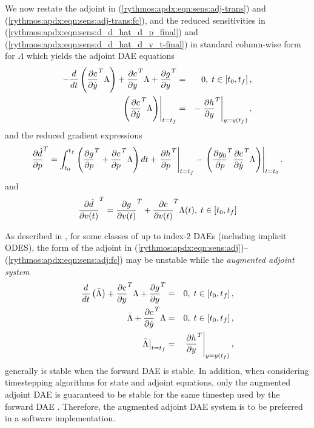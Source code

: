\documentclass[pdf,ps2pdf,11pt]{SANDreport}
\begin{document}
We now restate the adjoint in (\ref{rythmos:apdx:eqn:sens:adj-trans}) and
(\ref{rythmos:apdx:eqn:sens:adj-trans:fc}), and the reduced sensitivities in
(\ref{rythmos:apdx:eqn:sens:d_d_hat_d_p_final}) and
(\ref{rythmos:apdx:eqn:sens:d_d_hat_d_v_t-final}) in standard column-wise form
for $\Lambda$ which yields the adjoint DAE equations
%
\begin{eqnarray}
- \frac{d}{dt}\left( \displaystyle{\frac{\partial c}{\partial \dot{y}}}^T \Lambda \right)
+  \displaystyle{\frac{\partial c}{\partial y}}^T \Lambda + \displaystyle{\frac{\partial g}{\partial y}}^T
& = & 0, \; t \in \left[ t_0, t_f \right],
\label{rythmos:apdx:eqn:sens:adj} \\
\left.\left( \displaystyle{\frac{\partial c}{\partial \dot{y}}}^T \Lambda \right)\right|_{t=t_f}
& = & - \left. \displaystyle{\frac{\partial h}{\partial y}}^T \right|_{y=y(t_f)},
\label{rythmos:apdx:eqn:sens:adj:fc}
\end{eqnarray}
%
and the reduced gradient expressions
%
\begin{equation}
\displaystyle{\frac{\partial \hat{d}}{\partial p}}^T =
\int_{t_0}^{t_f} \left(
    \displaystyle{\frac{\partial g}{\partial p}}^T
    + \displaystyle{\frac{\partial c}{\partial p}}^T \Lambda
  \right) dt
  + \left. \displaystyle{\frac{\partial h}{\partial p}}^T \right|_{t=t_f}
  - \left. \left( \displaystyle{\frac{\partial y_0}{\partial p}}^T \displaystyle{\frac{\partial c}{\partial \dot{y}}}^T \Lambda \right) \right|_{t=t_0}.
\label{rythmos:apdx:eqn:sens:d_d_hat_d_p_final-2}
\end{equation}
%
and
%
\begin{equation}
\displaystyle{\frac{\partial \hat{d}}{\partial v(t)}}^T =  \displaystyle{\frac{\partial g}{\partial v(t)}}^T + \displaystyle{\frac{\partial c}{\partial v(t)}}^T \Lambda(t), \; t\in[t_0,t_f]
\label{rythmos:apdx:eqn:sens:d_d_hat_d_v_t-final-2}
\end{equation}
%

As described in {}\cite{adjoint-sens-2003}, for some classes of up to index-2
DAEs (including implicit ODES), the form of the adjoint in
(\ref{rythmos:apdx:eqn:sens:adj})--(\ref{rythmos:apdx:eqn:sens:adj:fc}) may be
unstable while the {}\textit{augmented adjoint system}
%
\begin{eqnarray}
\frac{d}{dt}\left( \bar{\Lambda} \right)
+  \displaystyle{\frac{\partial c}{\partial y}}^T \Lambda + \displaystyle{\frac{\partial g}{\partial y}}^T
& = & 0, \; t \in \left[ t_0, t_f \right],
\label{rythmos:apdx:eqn:sens:aug-adj-de} \\
\bar{\Lambda} + \displaystyle{\frac{\partial c}{\partial \dot{y}}}^T \Lambda
& = & 0, \; t \in \left[ t_0, t_f \right],
\label{rythmos:apdx:eqn:sens:aug-adj-ae} \\
\left. \bar{\Lambda} \right|_{t=t_f}
& = & \left. \displaystyle{\frac{\partial h}{\partial y}}^T \right|_{y=y(t_f)},
\label{rythmos:apdx:eqn:sens:aug-adj:fc}
\end{eqnarray}
%
generally is stable when the forward DAE is stable.  In addition, when
considering timestepping algorithms for state and adjoint equations, only the
augmented adjoint DAE is guaranteed to be stable for the same timestep used by
the forward DAE {}\cite{adjoint-sens-2003}.  Therefore, the augmented adjoint
DAE system is to be preferred in a software implementation.
\end{document}
